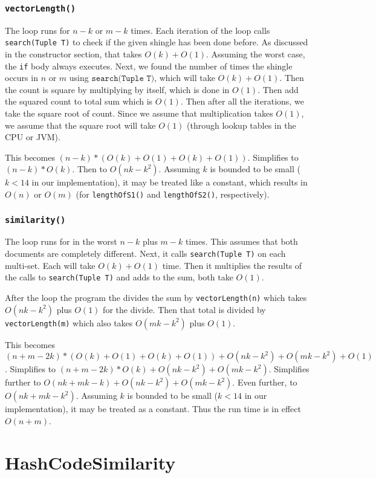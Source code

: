 \documentclass[10pt,letterpaper]{article}
\begin{document}
\subsubsection{\texttt{vectorLength()}}
The loop runs for $n-k$ or $m-k$ times. Each iteration of the loop calls \texttt{search(Tuple T)} to check if the given shingle has been done before. As discussed in the constructor section, that takes $O(k) + O(1)$. Assuming the worst case, the \texttt{if} body always executes. Next, we found the number of times the shingle occurs in $n$ or $m$ using $ \texttt{search(Tuple T)}$, which will take $O(k) + O(1)$. Then the count is square by multiplying by itself, which is done in $O(1)$. Then add the squared count to total sum which is $O(1)$. Then after all the iterations, we take the square root of count. Since we assume that multiplication takes $O(1)$, we assume that the square root will take $O(1)$ (through lookup tables in the CPU or JVM).

This becomes $(n-k)*(O(k)+O(1)+O(k)+O(1))$. Simplifies to $(n-k)*O(k)$. Then to $O(nk-k^2)$. Assuming $k$ is bounded to be small ($k<14$ in our implementation), it may be treated like a constant, which results in $O(n)$ or $O(m)$ (for \texttt{lengthOfS1()} and \texttt{lengthOfS2()}, respectively).
\subsubsection{\texttt{similarity()}}
The loop runs for in the worst $n-k$ plus $m-k$ times. This assumes that both documents are completely different. Next, it calls \texttt{search(Tuple T)} on each multi-set. Each will take $O(k) + O(1)$ time. Then it multiplies the results of the calls to \texttt{search(Tuple T)} and adds to the sum, both take $O(1)$.

After the loop the program the divides the sum by \texttt{vectorLength(n)} which takes $O(nk-k^2)$ plus $O(1)$ for the divide. Then that total is divided by \texttt{vectorLength(m)} which also takes $O(mk-k^2)$ plus $O(1)$.

This becomes $(n+m-2k)*(O(k)+O(1)+O(k)+O(1))+O(nk-k^2)+O(mk-k^2)+O(1)$. Simplifies to $(n+m-2k)*O(k)+O(nk-k^2)+O(mk-k^2)$. Simplifies further to $O(nk+mk-k)+O(nk-k^2)+O(mk-k^2)$. Even further, to $O(nk+mk-k^2)$. Assuming $k$ is bounded to be small ($k<14$ in our implementation), it may be treated as a constant. Thus the run time is in effect $O(n+m)$.
\section{HashCodeSimilarity}
\end{document}
